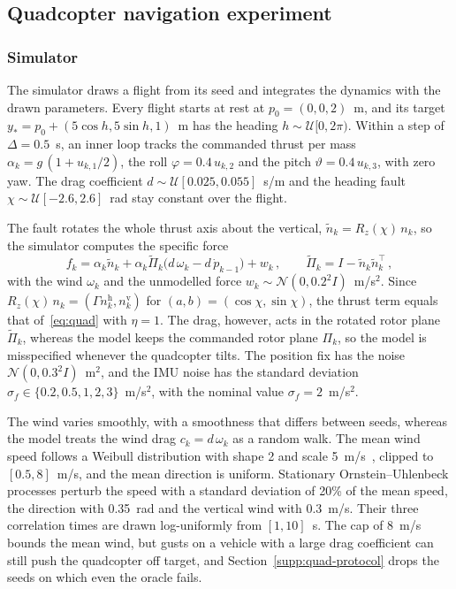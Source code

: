 \documentclass{l4dc2027}
\def\cN{\mathcal{N}}
\begin{document}
\subsection{Quadcopter navigation experiment}

\subsubsection{Simulator}\label{supp:quad-simulator}

The simulator draws a flight from its seed and integrates the dynamics with the drawn parameters. Every flight starts at rest at $p_0 = (0, 0, 2)$~m, and its target $y_* = p_0 + (5\cos h, 5\sin h, 1)$~m has the heading $h \sim \mathcal{U}[0, 2\pi)$. Within a step of $\Delta = 0.5$~s, an inner loop tracks the commanded thrust per mass $\alpha_k = g\,(1 + u_{k,1}/2)$, the roll $\varphi = 0.4\,u_{k,2}$ and the pitch $\vartheta = 0.4\,u_{k,3}$, with zero yaw. The drag coefficient $d \sim \mathcal{U}[0.025, 0.055]$~s/m and the heading fault $\chi \sim \mathcal{U}[-2.6, 2.6]$~rad stay constant over the flight.

The fault rotates the whole thrust axis about the vertical, $\tilde n_k = R_z(\chi)\, n_k$, so the simulator computes the specific force
\begin{equation}\label{eq:quad-true}
	f_k = \alpha_k \tilde n_k + \alpha_k \tilde\Pi_k \big(d\,\omega_k - d\,\dot p_{k-1}\big) + w_k \, , \qquad \tilde\Pi_k = I - \tilde n_k \tilde n_k^\top \, ,
\end{equation}
with the wind $\omega_k$ and the unmodelled force $w_k \sim \cN(0, 0.2^2 I)$~m/s$^2$. Since $R_z(\chi)\, n_k = (\Gamma n^{\mathrm{h}}_k, n^{\mathrm{v}}_k)$ for $(a, b) = (\cos\chi, \sin\chi)$, the thrust term equals that of~\eqref{eq:quad} with $\eta = 1$. The drag, however, acts in the rotated rotor plane $\tilde\Pi_k$, whereas the model keeps the commanded rotor plane $\Pi_k$, so the model is misspecified whenever the quadcopter tilts. The position fix has the noise $\cN(0, 0.3^2 I)$~m$^2$, and the IMU noise has the standard deviation $\sigma_f \in \{0.2, 0.5, 1, 2, 3\}$~m/s$^2$, with the nominal value $\sigma_f = 2$~m/s$^2$.

The wind varies smoothly, with a smoothness that differs between seeds, whereas the model treats the wind drag $c_k = d\,\omega_k$ as a random walk. The mean wind speed follows a Weibull distribution with shape 2 and scale 5~m/s~\citep{justus1978methods}, clipped to $[0.5, 8]$~m/s, and the mean direction is uniform. Stationary Ornstein--Uhlenbeck processes perturb the speed with a standard deviation of 20\% of the mean speed, the direction with 0.35~rad and the vertical wind with 0.3~m/s. Their three correlation times are drawn log-uniformly from $[1, 10]$~s. The cap of 8~m/s bounds the mean wind, but gusts on a vehicle with a large drag coefficient can still push the quadcopter off target, and Section~\ref{supp:quad-protocol} drops the seeds on which even the oracle fails.
\end{document}
